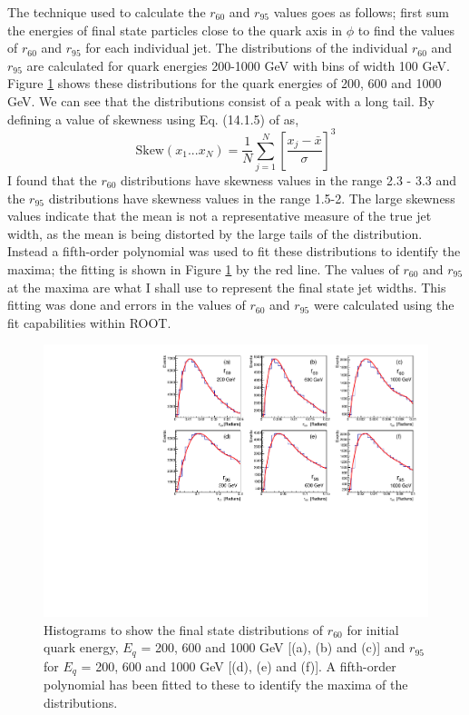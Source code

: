 \documentclass[a4paper,11pt, onecolumn]{article}
\begin{document}
  The technique used to calculate the $r_{60}$ and $r_{95}$ values goes as follows; first sum the energies of final state particles close to the 
  quark axis in $\phi$ to find the values of $r_{60}$ and $r_{95}$ for each individual jet. 
  The distributions of the individual $r_{60}$ and $r_{95}$ are calculated for quark energies 200-1000 
  GeV with bins of width 100 GeV. Figure \ref{r q distr} shows these distributions for the quark energies of 200, 600 and 1000 GeV.
  We can see that the distributions consist of a peak with a long tail. By defining a value of skewness using Eq. (14.1.5) of \cite{skewness} as,
  \begin{equation}
    \text{Skew}(x_1 ... x_N)  = \frac{1}{N} \sum\limits_{j=1}^N \left[\frac{x_j - \bar{x}}{\sigma}\right]^3   \label{skew}
  \end{equation}
  I found that the $r_{60}$ distributions have skewness values in the range 2.3 - 3.3 and the $r_{95}$ distributions have skewness values in the range
  1.5-2. The large skewness values indicate that the mean is not a representative measure of the true jet width, as the mean is being distorted by the large tails
  of the distribution.
  Instead a fifth-order polynomial was used to fit these distributions to identify the maxima; the fitting is shown in Figure \ref{r q distr} by the red line.  
  The values of $r_{60}$ and $r_{95}$ at the maxima are what I shall use to represent the final state jet widths. This fitting
  was done and errors in the values of $r_{60}$ and $r_{95}$ were calculated using the fit capabilities within ROOT.\\

  \begin{figure}[!htb]
    \begin{center}
      \includegraphics[width = \textwidth]{r_q_distr}
      \caption{Histograms to show the final state distributions of $r_{60}$ for initial quark energy, $E_{q}$ = 200, 600 and 1000 GeV [(a), (b) and (c)]
               and $r_{95}$ for $E_{q}$ = 200, 600 and 1000 GeV [(d), (e) and (f)]. A fifth-order polynomial has been
               fitted to these to identify the maxima of the distributions.  \vspace{-0.5cm} }
      \label{r q distr}
    \end{center}
  \end{figure}
\end{document}
